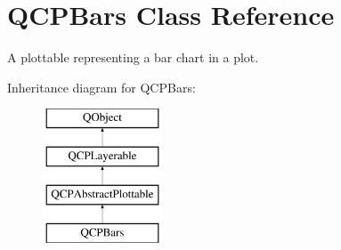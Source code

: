 \hypertarget{classQCPBars}{\section{Q\-C\-P\-Bars Class Reference}
\label{classQCPBars}
}


A plottable representing a bar chart in a plot.  


Inheritance diagram for Q\-C\-P\-Bars\-:\begin{figure}[H]
\begin{center}
\leavevmode
\includegraphics[height=4.000000cm]{classQCPBars}
\end{center}
\end{figure}
